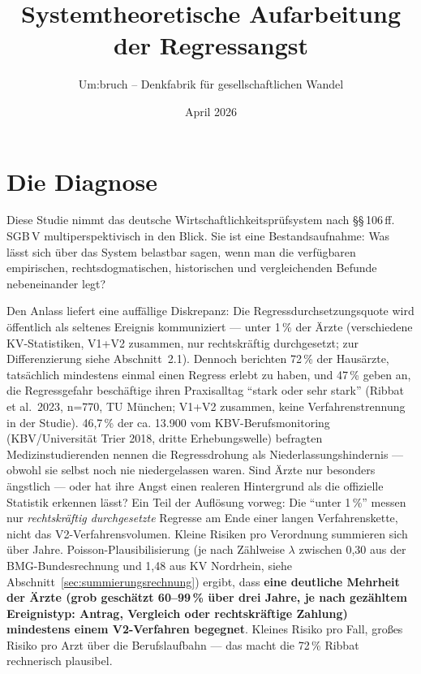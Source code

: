 \documentclass{umbruch-position}
\title{Systemtheoretische Aufarbeitung der Regressangst}
\author{Um:bruch -- Denkfabrik für gesellschaftlichen Wandel}
\date{April 2026}
\begin{document}
\maketitle
\newpage
\tableofcontents
\newpage


\section{Die Diagnose}

Diese Studie nimmt das deutsche Wirtschaftlichkeitsprüfsystem nach \S\S\,106\,ff. SGB\,V multiperspektivisch in den Blick. Sie ist eine Bestandsaufnahme: Was lässt sich über das System belastbar sagen, wenn man die verfügbaren empirischen, rechtsdogmatischen, historischen und vergleichenden Befunde nebeneinander legt?

Den Anlass liefert eine auff\"allige Diskrepanz: Die Regressdurchsetzungsquote wird \"offentlich als seltenes Ereignis kommuniziert --- unter 1\,\% der \"Arzte (verschiedene KV-Statistiken, V1+V2 zusammen, nur rechtskr\"aftig durchgesetzt; zur Differenzierung siehe Abschnitt~2.1). Dennoch berichten 72\,\% der Haus\"arzte, tats\"achlich mindestens einmal einen Regress erlebt zu haben, und 47\,\% geben an, die Regressgefahr besch\"aftige ihren Praxisalltag ``stark oder sehr stark'' (Ribbat et al.\ 2023, n=770, TU M\"unchen; V1+V2 zusammen, keine Verfahrenstrennung in der Studie). 46,7\,\% der ca. 13.900 vom KBV-Berufsmonitoring (KBV/Universit\"at Trier 2018, dritte Erhebungswelle) befragten Medizinstudierenden nennen die Regressdrohung als Niederlassungshindernis --- obwohl sie selbst noch nie niedergelassen waren. Sind \"Arzte nur besonders \"angstlich --- oder hat ihre Angst einen realeren Hintergrund als die offizielle Statistik erkennen l\"asst? Ein Teil der Aufl\"osung vorweg: Die ``unter 1\,\%'' messen nur \emph{rechtskr\"aftig durchgesetzte} Regresse am Ende einer langen Verfahrenskette, nicht das V2-Verfahrensvolumen. Kleine Risiken pro Verordnung summieren sich \"uber Jahre. Poisson-Plausibilisierung (je nach Z\"ahlweise $\lambda$ zwischen 0,30 aus der BMG-Bundesrechnung und 1,48 aus KV Nordrhein, siehe Abschnitt~\ref{sec:summierungsrechnung}) ergibt, dass \textbf{eine deutliche Mehrheit der \"Arzte (grob gesch\"atzt 60--99\,\% \"uber drei Jahre, je nach gez\"ahltem Ereignistyp: Antrag, Vergleich oder rechtskr\"aftige Zahlung) mindestens einem V2-Verfahren begegnet}. Kleines Risiko pro Fall, gro\ss{}es Risiko pro Arzt \"uber die Berufslaufbahn --- das macht die 72\,\% Ribbat rechnerisch plausibel.
\end{document}
